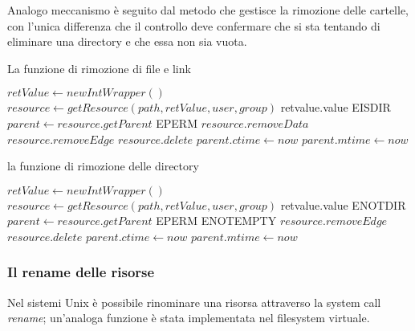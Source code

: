 Analogo meccanismo è seguito dal metodo che gestisce la rimozione delle cartelle, con l'unica differenza che il controllo deve confermare che si sta tentando di eliminare una directory e che essa non sia vuota.

\begin{algorithm}
\begin{algorithmic}[5]
\caption{La funzione di rimozione di file e link}
	\State $retValue \gets new IntWrapper()$
	\State $resource \gets getResource(path, retValue, user, group)$
		\State \Return retvalue.value
	\EndIf
		\State \Return EISDIR
	\EndIf
	\State $parent \gets resource.getParent$
		\State \Return EPERM
	\EndIf
		\State $resource.removeData$
	\EndIf
	\State $resource.removeEdge$
	\State $resource.delete$
	\State $parent.ctime \gets now$
	\State $parent.mtime \gets now$
	\State {}
\EndFunction
\end{algorithmic}
\end{algorithm}

\newpage

\begin{algorithm}
\begin{algorithmic}[5]
\caption{la funzione di rimozione delle directory}
	\State $retValue \gets new IntWrapper()$
	\State $resource \gets getResource(path, retValue, user, group)$
		\State \Return retvalue.value
	\EndIf
		\State \Return ENOTDIR
	\EndIf
	\State $parent \gets resource.getParent$
		\State \Return EPERM
	\EndIf
		\State \Return ENOTEMPTY
	\EndIf
	\State $resource.removeEdge$
	\State $resource.delete$
	\State $parent.ctime \gets now$
	\State $parent.mtime \gets now$
	\State {}
\EndFunction
\end{algorithmic}
\end{algorithm}

\subsubsection{Il rename delle risorse}
Nel sistemi Unix è possibile rinominare una risorsa attraverso la system call \emph{rename}; un'analoga funzione è stata implementata nel filesystem virtuale.

